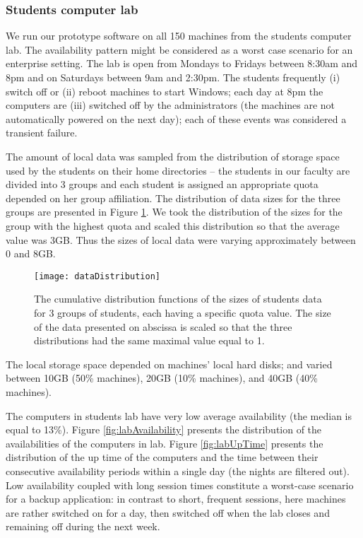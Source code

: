 \documentclass[10pt, final, conference, letterpaper]{IEEEtran}
\begin{document}
\subsubsection{Students computer lab}

We run our prototype software on all 150 machines from the students computer lab. The availability pattern might be considered as a worst case scenario for an enterprise setting. 
The lab is open from Mondays to Fridays between 8:30am and 8pm and on Saturdays between 9am and 2:30pm. The students frequently (i) switch off or (ii) reboot machines to start Windows; each day at 8pm the computers are (iii) switched off by the administrators (the machines are not automatically powered on the next day); each of these events was considered a transient failure. 

The amount of local data was sampled from the distribution of storage space used by the students on their home directories -- the students in our faculty are divided into 3 groups and each student is assigned an appropriate quota depended on her group affiliation. The distribution of data sizes for the three groups are presented in Figure \ref{fig:dataDistribution}.
We took the distribution of the sizes for the group with the highest quota and scaled this distribution so that the average value was 3GB. Thus the sizes of local data were varying approximately between 0 and 8GB.

\begin{figure}[tb]
     \begin{center}
         \texttt{[image: dataDistribution]}
     \end{center}
     \caption{The cumulative distribution functions of the sizes of students data for 3 groups of students, each having a specific quota value. The size of the data presented on abscissa is scaled so that the three distributions had the same maximal value equal to 1.}
     \label{fig:dataDistribution}
 \end{figure}

The local storage space depended on machines' local hard disks; and varied between 10GB (50\% machines), 20GB (10\% machines), and 40GB (40\% machines).



The computers in students lab have very low average availability (the median is equal to 13\%). Figure \ref{fig:labAvailability} presents the distribution of the availabilities of the computers in lab. Figure \ref{fig:labUpTime} presents the distribution of the up time of the computers and the time between their consecutive availability periods within a single day (the nights are filtered out). Low availability coupled with long session times constitute a worst-case scenario for a backup application: in contrast to short, frequent sessions, here machines are rather switched on for a day, then switched off when the lab closes and remaining off during the next week.
\end{document}
